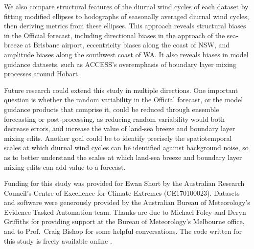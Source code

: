 \documentclass[twocol]{ametsoc}
\begin{document}
We also compare structural features of the diurnal wind cycles of each dataset by fitting modified ellipses to hodographs of seasonally averaged diurnal wind cycles, then deriving metrics from these ellipses. This approach reveals structural biases in the Official forecast, including directional biases in the approach of the sea-breeze at Brisbane airport, eccentricity biases along the coast of NSW, and amplitude biases along the southwest coast of WA. It also reveals biases in model guidance datasets, such as ACCESS's overemphasis of boundary layer mixing processes around Hobart.   

Future research could extend this study in multiple directions. One important question is whether the random variability in the Official forecast, or the model guidance products that comprise it, could be reduced through ensemble forecasting or post-processing, as reducing random variability would both decrease errors, and increase the value of land-sea breeze and boundary layer mixing edits. Another goal could be to identify precisely the spatiotemporal scales at which diurnal wind cycles can be identified against background noise, so as to better understand the scales at which land-sea breeze and boundary layer mixing edits can add value to a forecast.  

\acknowledgments
Funding for this study was provided for Ewan Short by the Australian Research Council's Centre of Excellence for Climate Extremes (CE170100023). Datasets and software were generously provided by the Australian Bureau of Meteorology's Evidence Tasked Automation team. Thanks are due to Michael Foley and Deryn Griffiths for providing support at the Bureau of Meteorology's Melbourne office, and to Prof.~Craig Bishop for some helpful conversations. The code written for this study is freely available online \citep{shortGitVeri19}.



\end{document}
